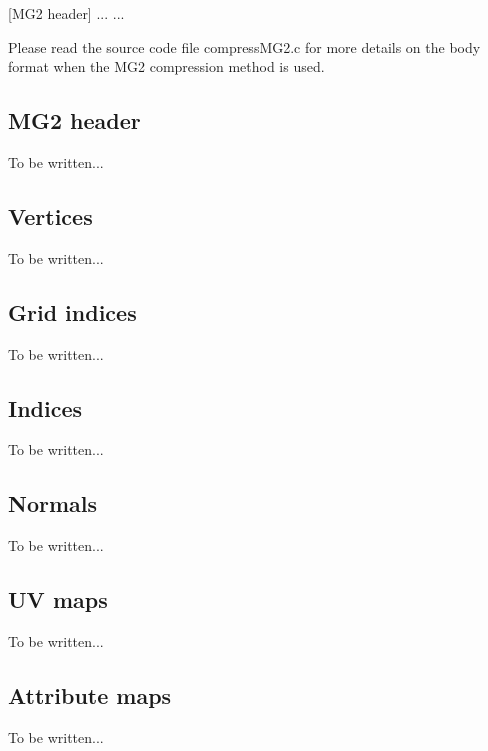 [MG2 header]\newline
[Vertices]\newline
[Indices]\newline
[Normals]\newline
[UV map 0]\newline
[UV map 1]\newline
...\newline
[UV map N]\newline
...

Please read the source code file compressMG2.c for more details on the body
format when the MG2 compression method is used.

\subsection{MG2 header}
To be written...

\subsection{Vertices}
To be written...

\subsection{Grid indices}
To be written...

\subsection{Indices}
To be written...

\subsection{Normals}
To be written...

\subsection{UV maps}
To be written...

\subsection{Attribute maps}
To be written...


